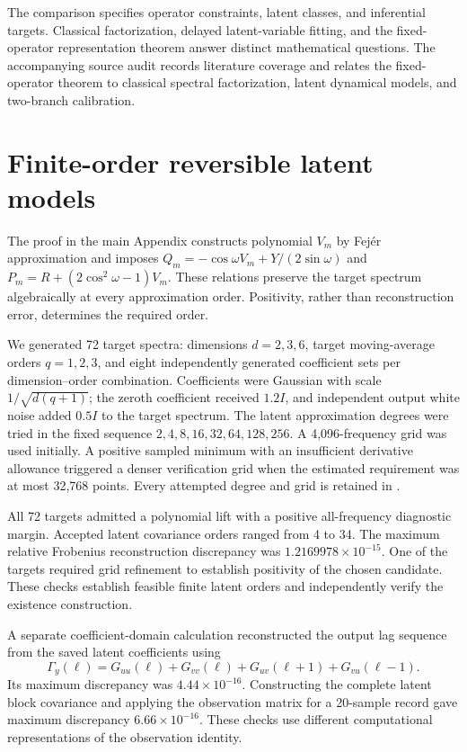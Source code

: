 The comparison specifies operator constraints, latent classes, and inferential targets. Classical factorization, delayed latent-variable fitting, and the fixed-operator representation theorem answer distinct mathematical questions. The accompanying source audit records literature coverage and relates the fixed-operator theorem to classical spectral factorization, latent dynamical models, and two-branch calibration.

\section{Finite-order reversible latent models}
The proof in the main Appendix constructs polynomial $V_m$ by Fej\'er approximation and imposes $Q_m=-\cos\omega V_m+Y/(2\sin\omega)$ and $P_m=R+(2\cos^2\omega-1)V_m$. These relations preserve the target spectrum algebraically at every approximation order. Positivity, rather than reconstruction error, determines the required order.

We generated 72 target spectra: dimensions $d=2,3,6$, target moving-average orders $q=1,2,3$, and eight independently generated coefficient sets per dimension--order combination. Coefficients were Gaussian with scale $1/\sqrt{d(q+1)}$; the zeroth coefficient received $1.2I$, and independent output white noise added $0.5I$ to the target spectrum. The latent approximation degrees were tried in the fixed sequence $2,4,8,16,32,64,128,256$. A 4,096-frequency grid was used initially. A positive sampled minimum with an insufficient derivative allowance triggered a denser verification grid when the estimated requirement was at most 32,768 points. Every attempted degree and grid is retained in .

All 72 targets admitted a polynomial lift with a positive all-frequency diagnostic margin. Accepted latent covariance orders ranged from 4 to 34. The maximum relative Frobenius reconstruction discrepancy was $1.2169978\times10^{-15}$. One of the targets required grid refinement to establish positivity of the chosen candidate. These checks establish feasible finite latent orders and independently verify the existence construction.

A separate coefficient-domain calculation reconstructed the output lag sequence from the saved latent coefficients using
\[
\Gamma_y(\ell)=G_{uu}(\ell)+G_{vv}(\ell)+G_{uv}(\ell+1)+G_{vu}(\ell-1).
\]
Its maximum discrepancy was $4.44\times10^{-16}$. Constructing the complete latent block covariance and applying the observation matrix for a 20-sample record gave maximum discrepancy $6.66\times10^{-16}$. These checks use different computational representations of the observation identity.

